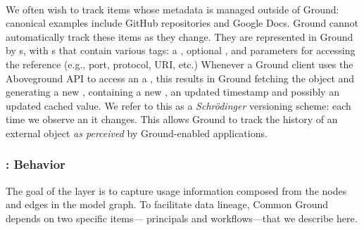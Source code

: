 \documentclass{sig-alternate}
\begin{document}
\\
We often wish to track items whose metadata is managed outside of Ground: canonical examples
include GitHub repositories and Google Docs. Ground cannot automatically track these items as they change.
They are represented in Ground by s, with s that contain various tags: a , optional , and parameters for accessing the
reference (e.g., port, protocol, URI, etc.) 
Whenever a Ground client uses the Aboveground API to access an a , this results in Ground fetching the object and generating a new , containing a new
, an updated timestamp and possibly an updated cached value. We refer to this as a \emph{Schr\"{o}dinger} versioning scheme: each time we observe an  it changes. This allows Ground to track the history of an external object \emph{as perceived} by Ground-enabled applications.


\subsubsection{\Crust: Behavior}
The goal of the \crust layer is to capture usage information composed from the nodes and edges in the model graph.  
To facilitate data lineage, Common Ground depends on two specific items---
principals and workflows---that we describe here.
\end{document}
